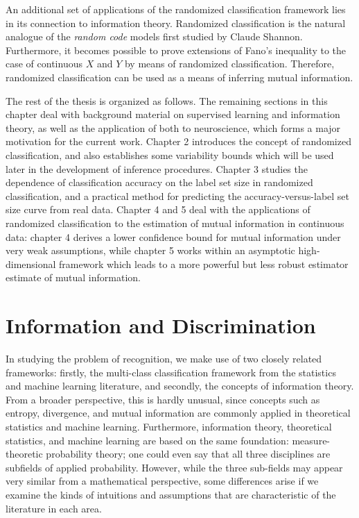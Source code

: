 An additional set of applications of the randomized classification
framework lies in its connection to information theory.  Randomized
classification is the natural analogue of the \emph{random code}
models first studied by Claude Shannon.  Furthermore, it becomes
possible to prove extensions of Fano's inequality to the case of
continuous $X$ and $Y$ by means of randomized classification.
Therefore, randomized classification can be used as a means of
inferring mutual information.

The rest of the thesis is organized as follows.  The remaining
sections in this chapter deal with background material on supervised
learning and information theory, as well as the application of both to
neuroscience, which forms a major motivation for the current work.
Chapter 2 introduces the concept of randomized classification, and
also establishes some variability bounds which will be used later in
the development of inference procedures.  Chapter 3 studies the
dependence of classification accuracy on the label set size in
randomized classification, and a practical method for predicting the
accuracy-versus-label set size curve from real data.  Chapter 4 and 5
deal with the applications of randomized classification to the
estimation of mutual information in continuous data: chapter 4 derives
a lower confidence bound for mutual information under very weak
assumptions, while chapter 5 works within an asymptotic
high-dimensional framework which leads to a more powerful but less
robust estimator estimate of mutual information.

\section{Information and Discrimination}

In studying the problem of recognition, we make use of two closely
related frameworks: firstly, the multi-class classification framework
from the statistics and machine learning literature, and secondly, the
concepts of information theory.  From a broader perspective, this is
hardly unusual, since concepts such as entropy, divergence, and mutual
information are commonly applied in theoretical statistics and machine
learning.  Furthermore, information theory, theoretical statistics,
and machine learning are based on the same foundation:
measure-theoretic probability theory; one could even say that all
three disciplines are subfields of applied probability.  However,
while the three sub-fields may appear very similar from a mathematical
perspective, some differences arise if we examine the kinds of
intuitions and assumptions that are characteristic of the literature
in each area.

